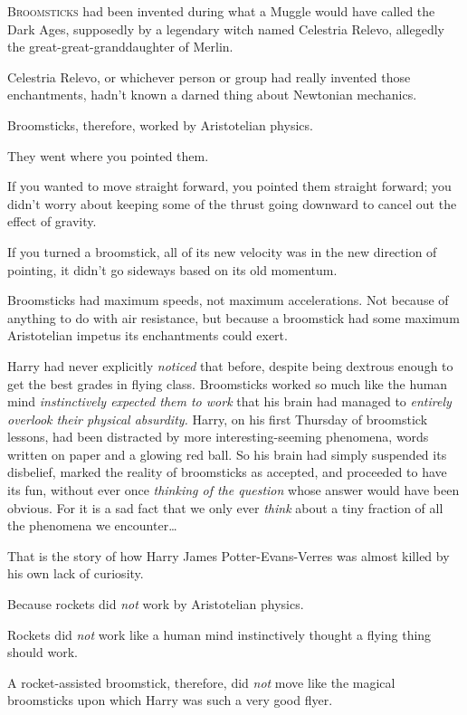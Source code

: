 
\lettrine{B}{roomsticks} had 
been invented during what a Muggle would have called the Dark Ages, supposedly 
by a legendary witch named Celestria Relevo, allegedly the 
great-great-granddaughter of Merlin.

Celestria Relevo, or whichever person or group had really invented those 
enchantments, hadn't known a darned thing about Newtonian mechanics.

Broomsticks, therefore, worked by Aristotelian physics.

They went where you pointed them.

If you wanted to move straight forward, you pointed them straight forward; you 
didn't worry about keeping some of the thrust going downward to cancel out the 
effect of gravity.

If you turned a broomstick, all of its new velocity was in the new direction of 
pointing, it didn't go sideways based on its old momentum.

Broomsticks had maximum speeds, not maximum accelerations. Not because of 
anything to do with air resistance, but because a broomstick had some maximum 
Aristotelian impetus its enchantments could exert.

Harry had never explicitly \emph{noticed} that before, despite being dextrous 
enough to get the best grades in flying class. Broomsticks worked so much like 
the human mind \emph{instinctively expected them to work} that his brain had 
managed to \emph{entirely overlook their physical absurdity.} Harry, on his 
first Thursday of broomstick lessons, had been distracted by more 
interesting-seeming phenomena, words written on paper and a glowing red ball. 
So his brain had simply suspended its disbelief, marked the reality of 
broomsticks as accepted, and proceeded to have its fun, without ever once 
\emph{thinking of the question} whose answer would have been obvious. For it is 
a sad fact that we only ever \emph{think} about a tiny fraction of all the 
phenomena we encounter{\ldots}

That is the story of how Harry James Potter-Evans-Verres was almost killed by 
his own lack of curiosity.

Because rockets did \emph{not} work by Aristotelian physics.

Rockets did \emph{not} work like a human mind instinctively thought a flying 
thing should work.

A rocket-assisted broomstick, therefore, did \emph{not} move like the magical 
broomsticks upon which Harry was such a very good flyer.

